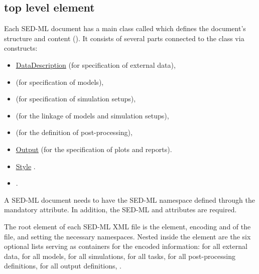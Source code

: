 \subsection{ top level element}
\label{class:sed-ml}
Each SED-ML \currentLV document has a main class called  which defines the document's structure and content (). It consists of several parts connected to the  class via \hyperref[class:listOf]{} constructs: 
\begin{itemize}
	\item \hyperref[class:dataDescription]{DataDescription} (for specification of external data), 
	\item \Model (for specification of models),
	\item \Simulation (for specification of simulation setups), 
	\item \AbstractTask (for the linkage of models and simulation setups), 
	\item \DataGenerator (for the definition of post-processing),
	\item \hyperref[class:output]{Output} (for the specification of plots and reports).
	\item \hyperref[class:style]{Style} .
	\item \AlgorithmParameter {}.
\end{itemize}

A SED-ML document needs to have the SED-ML namespace defined through the mandatory \hyperref[sec:xmlns]{} attribute. In addition, the SED-ML \hyperref[sec:level]{} and \hyperref[sec:version]{} attributes are required.

The root element of each SED-ML XML file is the  element, encoding \hyperref[sec:level]{} and \hyperref[sec:version]{} of the file, and setting the necessary namespaces. Nested inside the  element are the six optional lists serving as containers for the encoded information: \hyperref[class:listOfDataDescriptions]{} for all external data, \hyperref[class:listOfModels]{} for all models, \hyperref[class:listOfSimulations]{} for all simulations, \hyperref[class:listOfTasks]{} for all tasks, \hyperref[class:listOfDataGenerators]{} for all post-processing definitions, \hyperref[class:listOfOutputs]{} for all output definitions, .

